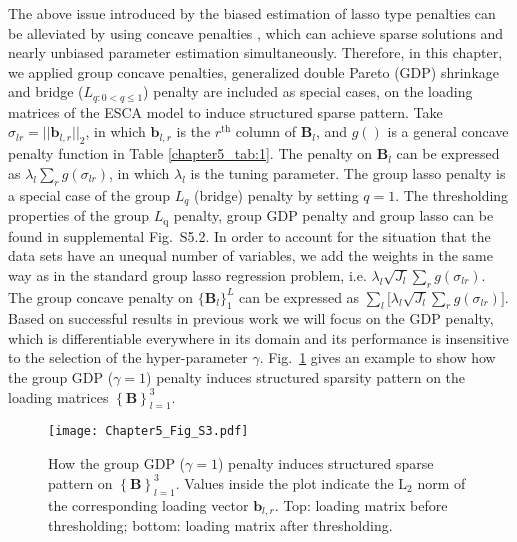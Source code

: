 The above issue introduced by the biased estimation of lasso type penalties can be alleviated by using concave penalties \cite{fu1998penalized,armagan2013generalized}, which can achieve sparse solutions and nearly unbiased parameter estimation simultaneously. Therefore, in this chapter, we applied group concave penalties, generalized double Pareto (GDP) shrinkage \cite{armagan2013generalized} and bridge ($L_{q: 0<q \leq 1}$) penalty \cite{fu1998penalized} are included as special cases, on the loading matrices of the ESCA model to induce structured sparse pattern. Take $\sigma_{lr} = ||\mathbf{b}_{l,r}||_2$, in which $\mathbf{b}_{l,r}$ is the $r^{\text{th}}$ column of $\mathbf{B}_l$, and $g()$ is a general concave penalty function in Table \ref{chapter5_tab:1}. The penalty on $\mathbf{B}_l$ can be expressed as $\lambda_l \sum_{r} g(\sigma_{lr})$, in which $\lambda_l$ is the tuning parameter. The group lasso penalty is a special case of the group $L_{q}$ (bridge) penalty by setting $q=1$. The thresholding properties of the group $L_{\text{q}}$ penalty, group GDP penalty and group lasso can be found in supplemental Fig.~S5.2. In order to account for the situation that the data sets have an unequal number of variables, we add the weights in the same way as in the standard group lasso regression problem, i.e. $\lambda_l \sqrt{J_l} \sum_{r} g(\sigma_{lr})$. The group concave penalty on $\{ \mathbf{B}_l \}_{1}^{L}$ can be expressed as $\sum_{l} \Big[\lambda_l \sqrt{J_l} \sum_{r} g(\sigma_{lr}) \Big]$. Based on successful results in previous work \cite{song2018generalized} we will focus on the GDP penalty, which is differentiable everywhere in its domain and its performance is insensitive to the selection of the hyper-parameter $\gamma$. Fig.~\ref{chapter5_fig:S3} gives an example to show how the group GDP ($\gamma = 1$) penalty induces structured sparsity pattern on the loading matrices $\left\{\mathbf{B} \right\}_{l=1}^3$.
\begin{figure}[htbp]
    \centering
    \texttt{[image: Chapter5\_Fig\_S3.pdf]}
    \caption{How the group GDP ($\gamma = 1$) penalty induces structured sparse pattern on $\left\{\mathbf{B} \right\}_{l=1}^3$. Values inside the plot indicate the $\text{L}_2$ norm of the corresponding loading vector $\mathbf{b}_{l,r}$. Top: loading matrix before thresholding; bottom: loading matrix after thresholding.}
	\label{chapter5_fig:S3}
\end{figure}

